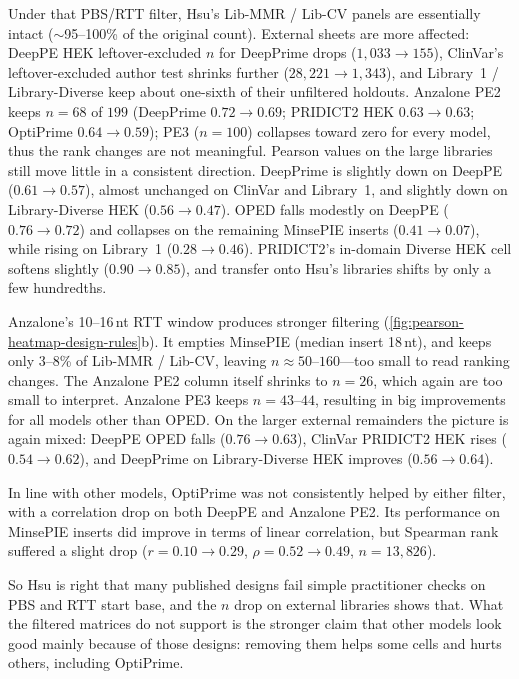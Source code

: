 \documentclass{article}
\begin{document}
Under that PBS/RTT filter, Hsu's Lib-MMR / Lib-CV panels are essentially intact (${\sim}$95--100\% of the original count). External sheets are more affected: DeepPE HEK leftover-excluded $n$ for DeepPrime drops ($1{,}033 \to 155$), ClinVar's leftover-excluded author test shrinks further ($28{,}221 \to 1{,}343$), and Library~1 / Library-Diverse keep about one-sixth of their unfiltered holdouts. Anzalone PE2 keeps $n = 68$ of $199$ (DeepPrime $0.72 \to 0.69$; PRIDICT2 HEK $0.63 \to 0.63$; OptiPrime $0.64 \to 0.59$); PE3 ($n = 100$) collapses toward zero for every model, thus the rank changes are not meaningful. Pearson values on the large libraries still move little in a consistent direction. DeepPrime is slightly down on DeepPE ($0.61 \to 0.57$), almost unchanged on ClinVar and Library~1, and slightly down on Library-Diverse HEK ($0.56 \to 0.47$). OPED falls modestly on DeepPE ($0.76 \to 0.72$) and collapses on the remaining MinsePIE inserts ($0.41 \to 0.07$), while rising on Library~1 ($0.28 \to 0.46$). PRIDICT2's in-domain Diverse HEK cell softens slightly ($0.90 \to 0.85$), and transfer onto Hsu's libraries shifts by only a few hundredths.

Anzalone's 10--16\,nt RTT window produces stronger filtering (\autoref{fig:pearson-heatmap-design-rules}b). It empties MinsePIE (median insert 18\,nt), and keeps only 3--8\% of Lib-MMR / Lib-CV, leaving $n \approx 50$--$160$---too small to read ranking changes. The Anzalone PE2 column itself shrinks to $n = 26$, which again are too small to interpret. Anzalone PE3 keeps $n = 43$--$44$, resulting in big improvements for all models other than OPED. On the larger external remainders the picture is again mixed: DeepPE OPED falls ($0.76 \to 0.63$), ClinVar PRIDICT2 HEK rises ($0.54 \to 0.62$), and DeepPrime on Library-Diverse HEK improves ($0.56 \to 0.64$). 

In line with other models, OptiPrime was not consistently helped by either filter, with a correlation drop on both DeepPE and Anzalone PE2. Its performance on MinsePIE inserts did improve in terms of linear correlation, but Spearman rank suffered a slight drop ($r = 0.10 \to 0.29$, $\rho = 0.52 \to 0.49$, $n = 13{,}826$).

So Hsu is right that many published designs fail simple practitioner checks on PBS and RTT start base, and the $n$ drop on external libraries shows that. What the filtered matrices do not support is the stronger claim that other models look good mainly because of those designs: removing them helps some cells and hurts others, including OptiPrime. 
\end{document}
